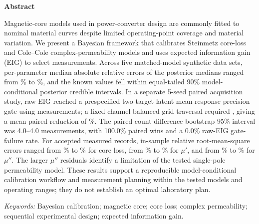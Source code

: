\documentclass[10pt,a4paper,twocolumn]{article}
\renewenvironment{abstract}{%
  \par\begin{center}\bfseries Abstract\end{center}\vspace{-.5em}\noindent
}{\par}
\providecommand{\EIGSeedCount}{5}
\providecommand{\EIGCountDifferenceCILow}{4.0}
\providecommand{\EIGCountDifferenceCIHigh}{4.0}
\providecommand{\EIGCountWinRate}{100.0}
\providecommand{\EIGRawFailureRate}{0.0}
\begin{document}

\begin{abstract}
Magnetic-core models used in power-converter design are commonly fitted to
nominal material curves despite limited operating-point coverage and material
variation. We present a Bayesian framework that calibrates Steinmetz core-loss
and Cole--Cole complex-permeability models and uses expected information gain
(EIG) to select measurements. Across five matched-model synthetic data sets,
per-parameter median absolute relative errors of the posterior medians ranged
from \RecoveryMedianMin\% to \RecoveryMedianMax\%, and the known values fell
within \RecoveryInclusion{} equal-tailed 90\% model-conditional posterior
credible intervals. In a separate \EIGSeedCount-seed paired acquisition
study, raw EIG reached a prespecified two-target latent
mean-response precision gate using \EIGRange{} measurements; a fixed
channel-balanced grid traversal required \UniformRange{}, giving a mean paired reduction of
\EIGReduction\%. The paired count-difference bootstrap 95\% interval was
\EIGCountDifferenceCILow--\EIGCountDifferenceCIHigh{} measurements, with
\EIGCountWinRate\% paired wins and a \EIGRawFailureRate\% raw-EIG gate-failure
rate. For accepted measured records, in-sample relative
root-mean-square errors ranged from \NEightySevenPcvRms\% to
\NNinetyFivePcvRms\% for core loss, from \NNinetyFiveMuRealRms\% to
\NEightySevenMuRealRms\% for $\mu'$, and from
\NNinetyFiveMuImagRms\% to \NEightySevenMuImagRms\% for $\mu''$. The larger
$\mu''$ residuals identify a limitation of the tested single-pole
permeability model. These results support a reproducible model-conditional
calibration workflow and measurement planning within the tested models and operating
ranges; they do not establish an optimal laboratory plan.
\end{abstract}
\par\smallskip
\noindent\textit{Keywords:} Bayesian calibration; magnetic core; core loss; complex permeability; sequential experimental design; expected information gain.
\vspace{8pt}
\end{document}
